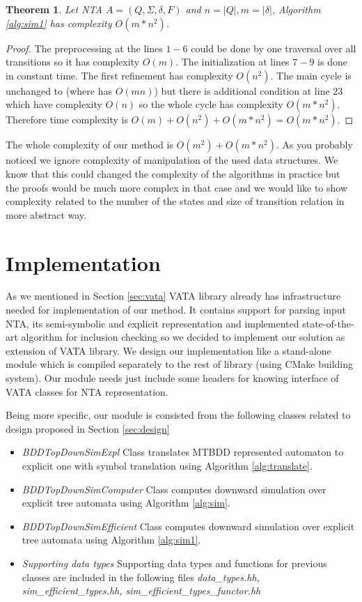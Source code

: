 \documentclass[a4paper, 12pt]{article}
\newtheorem{theorem}{Theorem}
\begin{document}
\begin{theorem}
	Let NTA $A=(Q,\Sigma,\delta, F)$ and $n=|Q|, m=|\delta|$, Algorithm \ref{alg:sim1} has complexity $O(m*n^2)$.
\end{theorem}
\begin{proof}
	The preprocessing at the lines $1-6$ could be done by one traversal over all transitions so it has complexity $O(m)$.
	The initialization at lines $7-9$ is done in constant time.
	The first refinement has complexity $O(n^2)$.
	The main cycle is unchanged to \cite{ilie:nfa} (where has $O(mn)$) but there is additional condition at line $23$ which have complexity $O(n)$ so
	the whole cycle has complexity $O(m*n^2)$.
	Therefore time complexity is $O(m) + O(n^2) + O(m*n^2) = O(m*n^2)$.
\end{proof}

The whole complexity of our method is $O(m^2)+O(m*n^2)$.
As you probably noticed we ignore complexity of manipulation of the used data structures.
We know that this could changed the complexity of the algorithms in practice but the proofs would be much more complex in that case
and we would like to show complexity related to the number of the states and size of transition relation in more abstract way.

\section{Implementation}
\label{sec:impl}

As we mentioned in Section \ref{sec:vata} VATA library already has infrastructure needed for implementation of
our method.
It contains support for parsing input NTA, its semi-symbolic and explicit representation and implemented
state-of-the-art algorithm for inclusion checking so we decided to implement our solution as extension of VATA library.
We design our implementation like a stand-alone module which is compiled separately to the rest of library (using CMake building system).
Our module needs just include some headers for knowing interface of VATA classes for NTA representation.

Being more specific, our module is consisted from the following classes related to design proposed in Section \ref{sec:design}
\begin{itemize}
	\item \emph{BDDTopDownSimExpl} Class translates MTBDD represented automaton to explicit one with symbol translation using Algorithm \ref{alg:translate}.
	\item \emph{BDDTopDownSimComputer} Class computes downward simulation over explicit tree automata using Algorithm \ref{alg:sim}.
	\item \emph{BDDTopDownSimEfficient} Class computes downward simulation over explicit tree automata using Algorithm \ref{alg:sim1}.
	\item \emph{Supporting data types} Supporting data types and functions for previous classes are included in the following files \emph{data\_types.hh, sim\_efficient\_types.hh, sim\_efficient\_types\_functor.hh}
\end{itemize}
\end{document}

